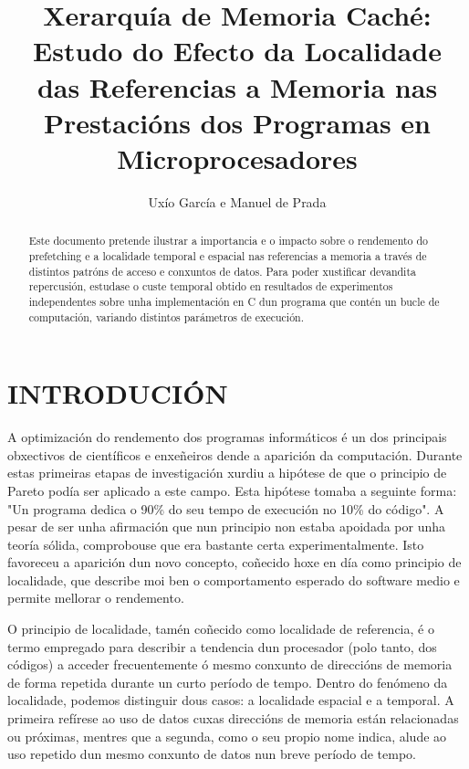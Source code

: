 \documentclass[letterpaper, 10 pt,spanish, conference]{ieeeconf}  %
\title{\LARGE \bf
Xerarquía de Memoria Caché: Estudo do Efecto da Localidade das Referencias a Memoria nas Prestacións dos Programas en Microprocesadores
}
\author{Uxío García e Manuel de Prada}
\begin{document}
\maketitle
\thispagestyle{empty}
\pagestyle{empty}


\begin{abstract}

Este documento pretende ilustrar a importancia e o impacto sobre o rendemento do prefetching e a localidade temporal e espacial nas referencias a memoria a través de distintos patróns de acceso e conxuntos de datos. Para poder xustificar devandita repercusión, estudase o custe temporal obtido en resultados de experimentos independentes sobre unha implementación en C dun programa que contén un bucle de computación, variando distintos parámetros de execución. 

\end{abstract}


\section{INTRODUCIÓN}

A optimización do rendemento dos programas informáticos é un dos principais obxectivos de científicos e enxeñeiros dende a aparición da computación. Durante estas primeiras etapas de investigación xurdiu a hipótese de que o principio de Pareto podía ser aplicado a este campo. Esta hipótese tomaba a seguinte forma: "Un programa dedica o 90\% do seu tempo de execución no 10\% do código". A pesar de ser unha afirmación que nun principio non estaba apoidada por unha teoría sólida, comprobouse que era bastante certa experimentalmente. Isto favoreceu a aparición dun novo concepto, coñecido hoxe en día como principio de localidade, que describe moi ben o comportamento esperado do software medio e permite mellorar o rendemento.

O principio de localidade, tamén coñecido como localidade de referencia, é o termo empregado para describir a tendencia dun procesador (polo tanto, dos códigos) a acceder frecuentemente ó mesmo conxunto de direccións de memoria de forma repetida durante un curto período de tempo. Dentro do fenómeno da localidade, podemos distinguir dous casos: a localidade espacial e a temporal. A primeira refírese ao uso de datos cuxas direccións de memoria están relacionadas ou próximas, mentres que a segunda, como o seu propio nome indica, alude ao uso repetido dun mesmo conxunto de datos nun breve período de tempo.
\end{document}
